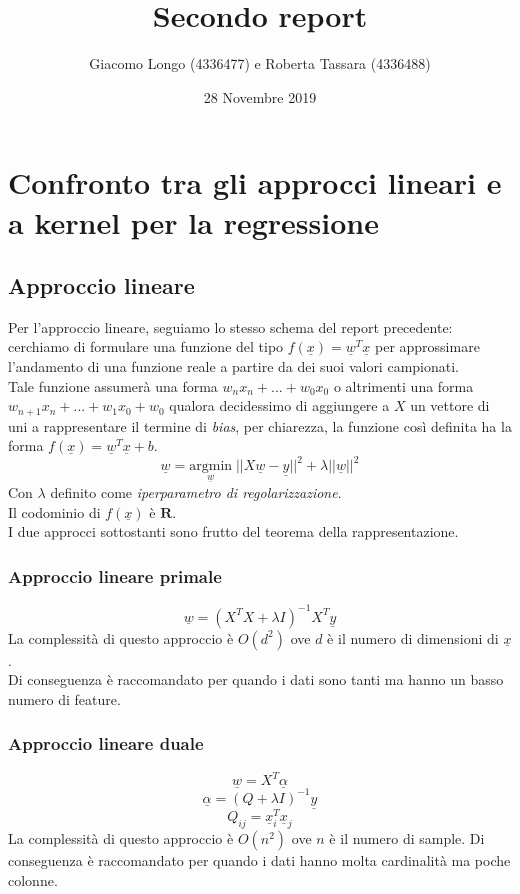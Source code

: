 \documentclass[12pt]{article}
\title{Secondo report}
\author{Giacomo Longo (4336477) e Roberta Tassara (4336488)}
\date{28 Novembre 2019}
\begin{document}
\begin{titlepage}
\maketitle
\end{titlepage}

\section{Confronto tra gli approcci lineari e a kernel per la regressione}
\subsection{Approccio lineare}
Per l'approccio lineare, seguiamo lo stesso schema del report precedente:
cerchiamo di formulare una funzione del tipo $f(\underline{x})=\underline{w}^T \underline{x}$
per approssimare l'andamento di una funzione reale a partire da dei suoi valori campionati. \\
Tale funzione assumerà una forma $w_n x_n + ... + w_0 x_0$ o altrimenti una forma $w_{n+1} x_n + ... + w_1 x_0 + w_0$
qualora decidessimo di aggiungere a $X$ un vettore di uni a rappresentare il termine di \textit{bias}, per chiarezza,
la funzione così definita ha la forma $f(\underline{x})=\underline{w}^T \underline{x} + b$.
$$
  \underline{w} = \underset{\underline{w}}{\text{argmin}} \; || X \underline{w} - \underline{y} ||^2 + \lambda || \underline{w} ||^2
$$
Con $\lambda$ definito come \textit{iperparametro di regolarizzazione}. \\
Il codominio di $f(\underline{x})$ è $\mathbf{R}$. \\
I due approcci sottostanti sono frutto del teorema della rappresentazione.

\subsubsection{Approccio lineare primale}
$$
  \underline{w} = (X^T X + \lambda I)^{-1} X^T \underline{y}
$$
La complessità di questo approccio è $O(d^2)$ ove $d$ è il numero di dimensioni di $\underline{x}$. \\
Di conseguenza è raccomandato per quando i dati sono tanti ma hanno un basso numero di feature.

\subsubsection{Approccio lineare duale}
$$
  \underline{w} = X^T \underline{\alpha}
$$
$$
  \underline{\alpha} = (Q + \lambda I)^{-1} \underline{y}
$$
$$
  Q_{ij} = \underline{x}_i^T \underline{x}_j
$$
La complessità di questo approccio è $O(n^2)$ ove $n$ è il numero di sample.
Di conseguenza è raccomandato per quando i dati hanno molta cardinalità ma poche colonne.
\end{document}
